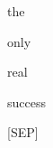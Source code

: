\documentclass[varwidth=150mm]{standalone}
\begin{document}
\begin{CJK*}{UTF8}{gbsn}
{{{\colorbox{red!7.233118057250977}{\strut the} \colorbox{red!0.0}{\strut only} \colorbox{red!3.1318187713623047}{\strut real} \colorbox{red!23.9826717376709}{\strut success} \colorbox{red!2.067898750305176}{\strut [SEP]}
}}}
\end{CJK*}
\end{document}
